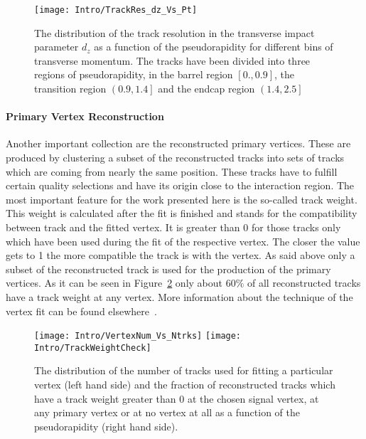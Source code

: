 \begin{figure}[!Hhtb]
    \centering
    \texttt{[image: Intro/TrackRes\_dz\_Vs\_Pt]}
    \caption[Track resolution \vs pseudo rapidity for different bins of transverse momentum]{The distribution of the track resolution in the transverse impact parameter $d_{z}$ as a function of the pseudorapidity for different bins of transverse momentum. The tracks have been divided into three regions of pseudorapidity, in the barrel region $\left[0., 0.9\right]$, the transition region $\left(0.9, 1.4\right]$ and the endcap region $\left(1.4, 2.5\right]$\label{plot:IntroTrackRes}}
\end{figure}

\paragraph{Primary Vertex Reconstruction \label{sec:LHCCMSPVR}}

Another important collection are the reconstructed primary vertices. These are produced by clustering a subset of the reconstructed tracks into sets of tracks which are coming from nearly the same position. These tracks have to fulfill certain quality selections and have its origin close to the interaction region. The most important feature for the work presented here is the so-called track weight. This weight is calculated after the fit is finished and stands for the compatibility between track and the fitted vertex. It is greater than 0 for those tracks only which have been used during the fit of the respective vertex. The closer the value gets to 1 the more compatible the track is with the vertex. As said above only a subset of the reconstructed track is used for the production of the primary vertices. As it can be seen in Figure~\ref{plot:IntroTrackWeight} only about $60\%$ of all reconstructed tracks have a track weight at any vertex.  More information about the technique of the vertex fit can be found elsewhere~\cite{CMS-PAPER-TRK-11-001}.

\begin{figure}[!Hhtb]
    \centering
    \texttt{[image: Intro/VertexNum\_Vs\_Ntrks]}
    \texttt{[image: Intro/TrackWeightCheck]}
    \caption[Distribution of number of tracks used for fitting the vertices and fraction of reconstructed tracks which have a track weight at any primary vertex]{The distribution of the number of tracks used for fitting a particular vertex (left hand side) and the fraction of reconstructed tracks which have a track weight greater than 0 at the chosen signal vertex, at any primary vertex or at no vertex at all as a function of the pseudorapidity (right hand side). \label{plot:IntroTrackWeight}}
\end{figure}

